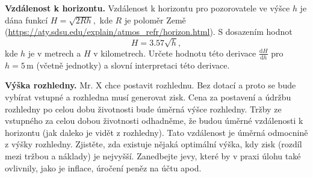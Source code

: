 \documentclass{article}
\let\oldtextbf\textbf
\def\textbf#1{%
  \oldtextbf{\color{red} #1}}
\begin{document}
\textbf{Vzdálenost k horizontu.}
Vzdálenost k horizontu pro pozorovatele ve výšce $h$ je dána funkcí $H=\sqrt {2Rh},$ kde $R$ je poloměr Země (\url{https://aty.sdsu.edu/explain/atmos_refr/horizon.html}). S dosazením hodnot $$H=3.57\sqrt{h},$$ kde $h$ je v metrech a $H$ v kilometrech. Určete hodnotu této derivace $\frac{\mathrm d H}{\mathrm dh}$ pro $h=5\,\mathrm{m}$ (včetně jednotky) a slovní interpretaci této derivace.


\textbf{Výška rozhledny.} Mr. X chce postavit rozhlednu. Bez
dotací a proto se bude vybírat vstupné a rozhledna musí generovat
zisk.  Cena za postavení a údržbu rozhledny po celou dobu životnosti
bude úměrná výšce rozhledny.  Tržby ze vstupného za celou dobou
životnosti odhadněme, že budou úměrné vzdálenosti k horizontu (jak
daleko je vidět z rozhledny). Tato vzdálenost je úměrná odmocnině z
výšky rozhledny. Zjistěte, zda existuje nějaká optimální výška, kdy
zisk (rozdíl mezi tržbou a náklady) je nejvyšší. Zanedbejte jevy, které
by v praxi úlohu také ovlivnily, jako je inflace, úročení peněz na
účtu apod.
\end{document}
